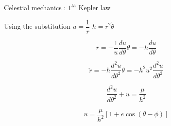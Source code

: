 \documentclass{beamer}
\begin{document}
\begin{frame}{Celestial mechanics \cite{murray1999solar}: $1^{th}$ Kepler law}
\begin{center}
Using the substitution $u=\dfrac{1}{r}$ $h=r^{2}\dot{\theta}$
\end{center}

\begin{equation}
\dot{r}=-\frac{1}{u}\dfrac{du}{d\theta}\dot{\theta}=-h\frac{du}{d\theta}
\end{equation}

\begin{equation}
\ddot{r}=-h\dfrac{d^{2}u}{d\theta^{2}}\dot{\theta}=-h^{2}u^{2}\frac{d^{2}u}{d\theta^{2}}
\end{equation}

\begin{equation}
\dfrac{d^{2}u}{d\theta^{2}}+u=\frac{\mu}{h^{2}}
\end{equation}

\begin{equation}
u=\frac{\mu}{h^{2}}\left[1+e\cos(\theta-\phi)\right]
\end{equation}

\end{frame}
\end{document}
